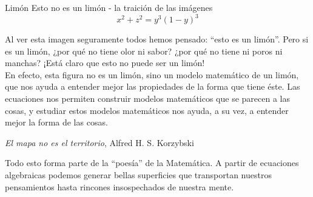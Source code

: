 \begin{surferPage}{Limón}
Esto no es un lim\'on - la traici\'on de las im\'agenes\\
\smallskip
\[x^2 + z^2 = y^3 (1 - y)^3\] 

\vspace{0.3cm}
Al ver esta imagen seguramente todos hemos pensado: “esto es un lim\'on”. Pero si es un lim\'on, ¿por qu\'e no tiene olor ni sabor? ¿por qu\'e no tiene ni poros ni manchas? ¡Est\'a claro que esto no puede ser un lim\'on!\\
\vspace{0.3cm}
En efecto, esta figura no es un lim\'on, sino un modelo matem\'atico de un lim\'on, que nos ayuda a entender mejor las propiedades de la forma que tiene \'este. Las ecuaciones nos permiten construir modelos matem\'aticos que se parecen a las cosas, y estudiar estos modelos matem\'aticos nos ayuda, a su vez, a entender mejor la forma de las cosas.
\vspace{0.3cm}
\begin{center}
\emph{El mapa no es el territorio}, Alfred H. S. Korzybski
\end{center}
\vspace{0.3cm}
Todo esto forma parte de la “poes\'ia” de la Matem\'atica. A partir de ecuaciones algebraicas podemos generar bellas superficies que transportan nuestros pensamientos hasta rincones insospechados de nuestra mente.
\end{surferPage}
